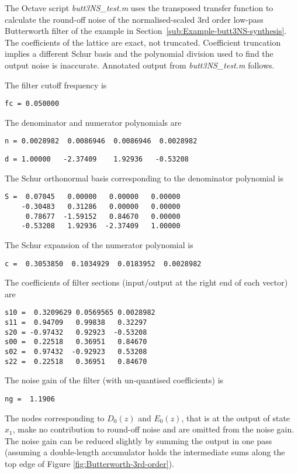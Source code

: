 \documentclass[a4paper,twoside,10pt,english]{report}
\begin{document}
The Octave script \emph{butt3NS\_test.m}
uses the transposed transfer function to calculate the round-off noise 
of the normalised-scaled 3rd order low-pass Butterworth filter of the example
in Section~\ref{sub:Example-butt3NS-synthesis}. The coefficients of the 
lattice are exact, not truncated. Coefficient truncation implies a different
Schur basis and the polynomial division used to find the output noise is
inaccurate. Annotated output from \emph{butt3NS\_test.m} follows.

The filter cutoff frequency is
\begin{small}
\begin{verbatim}
fc = 0.050000
\end{verbatim}
\end{small}
The denominator and numerator polynomials are
\begin{small}
\begin{verbatim}
n = 0.0028982  0.0086946  0.0086946  0.0028982
\end{verbatim}
\end{small}
\begin{small}
\begin{verbatim}
d = 1.00000   -2.37409    1.92936   -0.53208
\end{verbatim}
\end{small}
The Schur orthonormal basis corresponding to the denominator polynomial
is
\begin{small}
\begin{verbatim}
S =  0.07045   0.00000   0.00000   0.00000
    -0.30483   0.31286   0.00000   0.00000
     0.78677  -1.59152   0.84670   0.00000
    -0.53208   1.92936  -2.37409   1.00000
\end{verbatim}
\end{small}
The Schur expansion of the numerator polynomial is
\begin{small}
\begin{verbatim}
c =  0.3053850  0.1034929  0.0183952  0.0028982
\end{verbatim}
\end{small}
The coefficients of filter sections (input/output at the right end
of each vector) are
\begin{small}
\begin{verbatim}
s10 =  0.3209629 0.0569565 0.0028982
s11 =  0.94709   0.99838   0.32297
s20 = -0.97432   0.92923  -0.53208
s00 =  0.22518   0.36951   0.84670
s02 =  0.97432  -0.92923   0.53208
s22 =  0.22518   0.36951   0.84670
\end{verbatim}
\end{small}
The noise gain of the filter (with un-quantised coefficients) is 
\begin{small}
\begin{verbatim}
ng =  1.1906
\end{verbatim}
\end{small}
The nodes corresponding to $D_{0}\left(z\right)$ and $E_{0}\left(z\right)$,
that is at the output of state $x_{1}$, make no contribution to round-off
noise and are omitted from the noise gain. The noise gain can be reduced
slightly by summing the output in one pass (assuming a double-length
accumulator holds the intermediate sums along the top edge of Figure
\ref{fig:Butterworth-3rd-order}).
\end{document}
